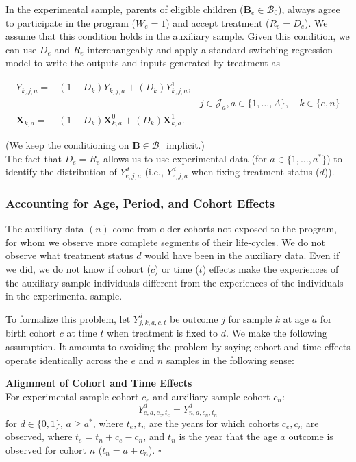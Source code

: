 In the experimental sample, parents of eligible children ($\bm{B}_e \in \mathcal{B}_{0}$), always agree to participate in the program ($W_e = 1$) and accept treatment ($R_e = D_e$). We assume that this condition holds in the auxiliary sample. Given this condition, we can use $D_e$ and $R_e$ interchangeably and apply a standard \citet{Quandt_1972_JASA} switching regression model to write the outputs and inputs generated by treatment as
\begin{spacing}{1}
\begin{align}\label{eq:countersystem}
Y_{k,j,a} =& \left( 1 - D_k \right) Y_{k,j,a}^0 + \left( D_k \right) Y_{k,j,a}^1, \\
&&j \in \mathcal{J}_a, a \in \{1,\dots,A\}, \quad k \in \{e,n\} \nonumber \\
\bm{X}_{k,a} =& \left( 1 - D_k \right) \bm{X}_{k,a}^0 + \left( D_k \right) \bm{X}_{k,a}^1. \nonumber
\end{align}
\end{spacing}

\noindent (We keep the conditioning on $\bm{B} \in \mathcal{B}_0$ implicit.)\\
The fact that $D_e = R_e$ allows us to use experimental data (for $a \in \{1, \dots,a^*\}$) to identify the distribution of $Y_{e,j,a}^d$ (i.e., $Y_{e,j,a}^d$ when fixing treatment status ($d$)).

\subsubsection{Accounting for Age, Period, and Cohort Effects}

The auxiliary data $(n)$ come from older cohorts not exposed to the program, for whom we observe more complete segments of their life-cycles. We do not observe what treatment status $d$ would have been in the auxiliary data. Even if we did, we do not know if cohort ($c$) or time ($t$) effects make the experiences of the auxiliary-sample individuals different from the experiences of the individuals in the experimental sample.

To formalize this problem, let $Y_{j,k,a,c,t}^d$ be outcome $j$ for sample $k$ at age $a$ for birth cohort $c$ at time $t$ when treatment is fixed to $d$. We make the following assumption. It amounts to avoiding the problem by saying cohort and time effects operate identically across the $e$ and $n$ samples in the following sense:

\onehalfspacing
\begin{assumption}\label{ass:alignment} \textbf{Alignment of Cohort and Time Effects}\\
For experimental sample cohort $c_{e}$ and auxiliary sample cohort $c_{n}$:
\begin{equation}
Y_{e,a,c_{e},t_{e}}^d = Y_{n,a,c_{n},t_{n}}^d
\end{equation}
for $d \in \{ 0, 1\}$, $a \geq a^*$, where $t_{e}, t_{n}$ are the years for which cohorts $c_{e}, c_{n}$ are observed, where $t_e = t_n + c_e - c_n$, and $t_n$ is the year that the age $a$ outcome is observed for cohort $n$ ($t_n = a + c_n$). $\square$
\end{assumption}
\doublespacing

